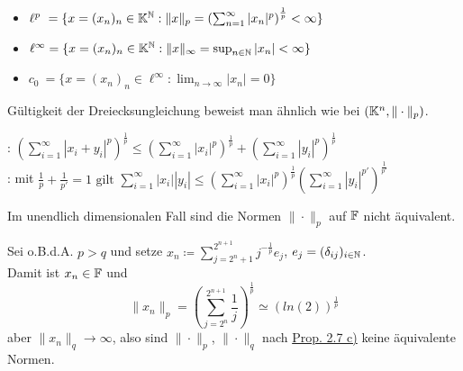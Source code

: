 \begin{beispiel}   
	\begin{itemize}
		\item $\ell^{p}~= \{ x = (x_{n})_{n} \in \mathbb{K}^{\mathbb{N}}: \|x\|_{p} = \left( \sum_{n = 1}^{\infty} | x_{n} |^{p}\right)^{\frac{1}{p}} < \infty \}$
		\item $\ell^{\infty} = \{ x = (x_{n})_{n} \in \mathbb{K}^{\mathbb{N}  }: \|x\|_{\infty} = \sup_{n \in \mathbb{N}} |x_{n}| < \infty \}$
		\item $c_{0} ~= \{ x = (x_{n})_{n} \in \ell^{\infty} : \lim_{n \rightarrow \infty} |x_{n}| = 0 \}$
	\end{itemize}
	Gültigkeit der Dreiecksungleichung beweist man ähnlich wie bei $(\mathbb{K}^{n}, \| \cdot \|_{p})$.
\end{beispiel}


\begin{lemma}
	: $\left( \sum_{i=1}^{\infty} |x_{i} + y_{i}|^p\right)^{\frac{1}{p}} \leq\left( \sum_{i=1}^{\infty} |x_{i}|^p\right)^{\frac{1}{p}} + \left( \sum_{i=1}^{\infty} |y_{i}|^p\right)^{\frac{1}{p}} $	\\
	: mit $\frac{1}{p} + \frac{1}{p'} = 1 \text{ gilt } \sum_{i=1}^{\infty} |x_{i}| |y_{i}| \leq \left( \sum_{i=1}^{\infty} |x_{i}|^{p} \right)^{\frac{1}{p}} \left( \sum_{i=1}^{\infty} |y_{i}|^{p'} \right)^{\frac{1}{p'}} $	\\	
\end{lemma}


\begin{bemerkung}
	Im unendlich dimensionalen Fall sind die Normen $\| \cdot \|_{p}$ auf $\mathbb{F}$ nicht äquivalent.
	\begin{beweis}
		Sei o.B.d.A. $p > q$ und setze $x_{n} \coloneqq \sum_{j = 2^{n} + 1}^{2^{n + 1}} j^{-\frac{1}{p}}e_{j}$, $e_{j} = ( \delta_{ij} )_{i \in \mathbb{N}}$. \\
		Damit ist $x_{n} \in \mathbb{F}$ und 
		\[ \| x_{n} \|_{p} = \left( \sum_{j = 2^{n}}^{2^{n + 1}} \frac{1}{j} \right)^{\frac{1}{p}} \simeq \left( ln(2) \right)^{\frac{1}{p}} \]
		aber $\| x_{n} \|_{q} \rightarrow \infty$, also sind $\| \cdot \|_{p}$, $\| \cdot \|_{q}$ nach \hyperref[prop:2.7]{Prop. 2.7 c)} keine äquivalente Normen.
	\end{beweis}	
\end{bemerkung}


